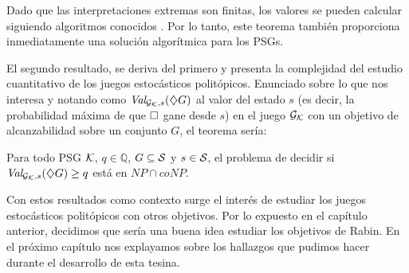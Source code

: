 Dado que las interpretaciones extremas son finitas, los valores se pueden
calcular siguiendo algoritmos conocidos \cite{CONDON1992,filar}. Por lo tanto,
este teorema también proporciona inmediatamente una solución algorítmica para
los PSGs.

El segundo resultado, se deriva del primero y presenta la complejidad del
estudio cuantitativo de los juegos estocásticos politópicos. Enunciado sobre lo
que nos interesa y notando como $\textit{Val}_{\mathcal{G}_{\mathcal{K}},s}(\diamondsuit G)$ al valor del estado $s$
(es decir, la probabilidad máxima de que $\square$ gane desde $s$) en el juego
$\mathcal{G}_{\mathcal{K}}$ con un objetivo de alcanzabilidad sobre un conjunto $G$, el teorema
sería:

\begin{theorem}
	Para todo PSG $\mathcal{K}$, $q \in \mathbb{Q}$, $G \subseteq \mathcal{S}$ y $s \in \mathcal{S}$, el problema de decidir si $\textit{Val}_{\mathcal{G}_{\mathcal{K}}, s}(\diamondsuit G) \geq q$ está en $NP \cap coNP$.
\end{theorem}

Con estos resultados como contexto surge el interés de estudiar los juegos
estocásticos politópicos con otros objetivos. Por lo expuesto en el capítulo
anterior, decidimos que sería una buena idea estudiar los objetivos de Rabin.
En el próximo capítulo nos explayamos sobre los hallazgos que pudimos hacer
durante el desarrollo de esta tesina.




